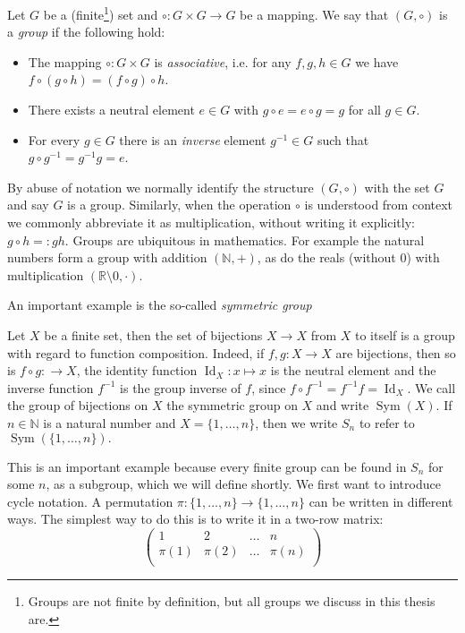 \begin{defn}
 Let $G$ be a (finite\footnote{Groups are not finite by definition, but all groups we discuss in this thesis are.}) set and $ \circ : G \times G \rightarrow G$ be a mapping. 
We say that $(G, \circ)$ is a \emph{group} if the following hold:
\begin{itemize}
\item The mapping $\circ : G \times G$ is \emph{associative}, i.e. for any $f,g,h \in G$ we have $f \circ (g \circ h) = (f \circ g) \circ h$.
\item There exists a neutral element $e \in G$ with $g \circ e = e \circ g = g$ for all $g \in G$.
\item For every $g \in G$ there is an \emph{inverse} element $g^{-1} \in G$ such that $g \circ g^{-1} = g^{-1} g = e$.
\end{itemize}
\end{defn}
By abuse of notation we normally identify the structure $(G,\circ)$ with the set $G$ and say $G$ is a group.
Similarly, when the operation $\circ$ is understood from context we commonly abbreviate it as multiplication, without writing it explicitly: $g \circ h =: gh$.
Groups are ubiquitous in mathematics. For example the natural numbers form a group with addition $(\mathbb{N},+)$, as do the reals (without 0) with multiplication $(\mathbb{R}\setminus{0},\cdot)$.

An important example is the so-called \emph{symmetric group}
\begin{ex}
Let $X$ be a finite set, then the set of bijections $X \rightarrow X$ from $X$ to itself is a group with regard to function composition.
Indeed, if $f,g : X \rightarrow X$ are bijections, then so is $f \circ g :  \rightarrow X$, the identity function $\operatorname{Id}_X : x \mapsto x$ is the neutral element and the inverse function $f^{-1}$ is the group inverse of $f$,
since $f \circ f^{-1} = f^{-1} f = \operatorname{Id}_X.$ We call the group of bijections on $X$ the symmetric group on $X$ and write $\operatorname{Sym}(X)$.
If $n \in \mathbb{N}$ is a natural number and $X = \{ 1 ,\ldots, n \}$, then we write $S_n$ to refer to $\operatorname{Sym}(\{1,\ldots,n\}).$
\end{ex}
This is an important example because every finite group can be found in $S_n$ for some $n$, as a subgroup, which we will define shortly.
We first want to introduce cycle notation. A permutation $\pi : \{ 1, \ldots, n \} \rightarrow \{ 1 , \ldots, n \}$ can be written in different ways.
The simplest way to do this is to write it in a two-row matrix:
\begin{equation*}
\left(
\begin{array}{cccc}
1 & 2 & \ldots & n \\
\pi(1) & \pi(2) & \ldots & \pi(n) \\
\end{array}
\right)
\end{equation*}

